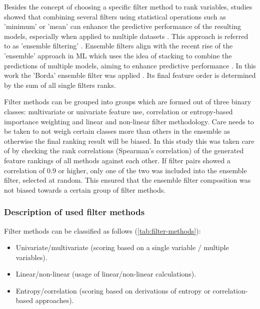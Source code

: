 \documentclass[journal]{IEEEtran}
\begin{document}
Besides the concept of choosing a specific filter method to rank variables, studies showed that combining several filters using statistical operations such as 'minimum' or 'mean' can enhance the predictive performance of the resulting models, especially when applied to multiple datasets \cite{abeel2010, drotar2017a}.
This approach is referred to as 'ensemble filtering' \cite{dietterich2000}.
Ensemble filters align with the recent rise of the 'ensemble' approach in ML which uses the idea of stacking to combine the predictions of multiple models, aiming to enhance predictive performance \cite{polikar2012, feurer2015, bolon-canedo2019}.
In this work the 'Borda' ensemble filter was applied \cite{drotar2017a}.
Its final feature order is determined by the sum of all single filters ranks.

Filter methods can be grouped into groups which are formed out of three binary classes: multivariate or univariate feature use, correlation or entropy-based importance weighting and linear and non-linear filter methodology.
Care needs to be taken to not weigh certain classes more than others in the ensemble as otherwise the final ranking result will be biased.
In this study this was taken care of by checking the rank correlations (Spearman's correlation) of the generated feature rankings of all methods against each other.
If filter pairs showed a correlation of 0.9 or higher, only one of the two was included into the ensemble filter, selected at random.
This ensured that the ensemble filter composition was not biased towards a certain group of filter methods.

\subsubsection{Description of used filter methods}

Filter methods can be classified as follows (\autoref{tab:filter-methods}):

\begin{itemize}
	\item Univariate/multivariate (scoring based on a single variable / multiple variables).
	\item Linear/non-linear (usage of linear/non-linear calculations).
	\item Entropy/correlation (scoring based on derivations of entropy or correlation-based approaches).
\end{itemize}
\end{document}
